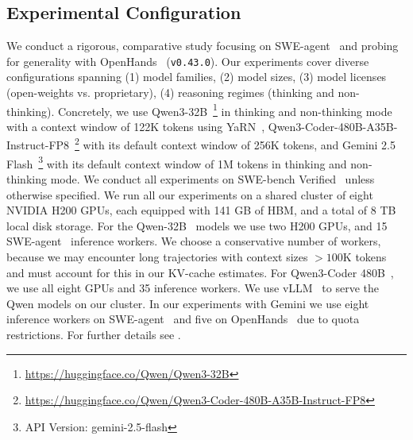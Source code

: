 \documentclass{article}
\begin{document}
\subsection{Experimental Configuration}
\label{subsec:experimental-configuration}
We conduct a rigorous, comparative study focusing on SWE-agent~\cite{yang_swe-agent_2024} and probing for generality with OpenHands~\cite{wang2025openhands} (\texttt{v0.43.0}). Our experiments cover diverse configurations spanning (1) model families, (2) model sizes, (3) model licenses (open-weights vs. proprietary), (4) reasoning regimes (thinking and non-thinking). Concretely, we use Qwen3-32B~\cite{qwen3technicalreport}\footnote{\url{https://huggingface.co/Qwen/Qwen3-32B}} in thinking and non-thinking mode with a context window of 122K tokens using YaRN~\cite{peng_yarn_2023}, Qwen3-Coder-480B-A35B-Instruct-FP8~\cite{qwen3technicalreport,hui2024qwen2}\footnote{\url{https://huggingface.co/Qwen/Qwen3-Coder-480B-A35B-Instruct-FP8}} with its default context window of 256K tokens, and Gemini 2.5 Flash~\cite{comanici_gemini_2025}\footnote{API Version: gemini-2.5-flash} with its default context window of 1M tokens in thinking and non-thinking mode. We conduct all experiments on SWE-bench Verified~\cite{openai_swe_bench_verified_2024} unless otherwise specified. We run all our experiments on a shared cluster of eight NVIDIA H200 GPUs, each equipped with 141 GB of HBM, and a total of 8 TB local disk storage. For the Qwen-32B~\cite{qwen3technicalreport} models we use two H200 GPUs, and 15 SWE-agent~\cite{yang_swe-agent_2024} inference workers. We choose a conservative number of workers, because we may encounter long trajectories with context sizes $>100$K tokens and must account for this in our KV-cache estimates. For Qwen3-Coder 480B~\cite{qwen3technicalreport,hui2024qwen2}, we use all eight GPUs and 35 inference workers. We use vLLM~\cite{kwon2023efficient} to serve the Qwen models on our cluster. In our experiments with Gemini we use eight inference workers on SWE-agent~\cite{yang_swe-agent_2024} and five on OpenHands~\cite{wang2025openhands} due to quota restrictions. For further details see .
\end{document}
